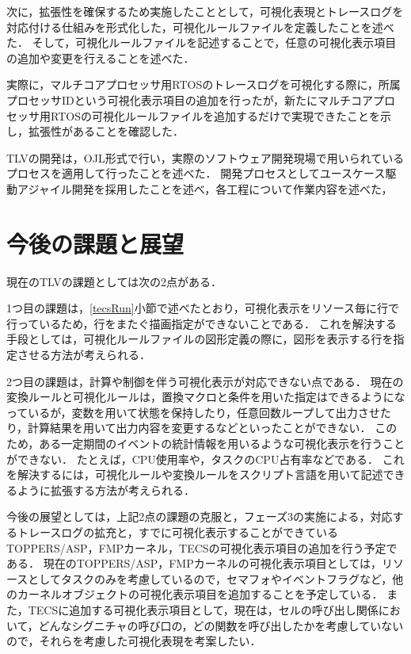 次に，拡張性を確保するため実施したこととして，可視化表現とトレースログを対応付ける仕組みを形式化した，可視化ルールファイルを定義したことを述べた．
そして，可視化ルールファイルを記述することで，任意の可視化表示項目の追加や変更を行えることを述べた．

実際に，マルチコアプロセッサ用RTOSのトレースログを可視化する際に，所属プロセッサIDという可視化表示項目の追加を行ったが，新たにマルチコアプロセッサ用RTOSの可視化ルールファイルを追加するだけで実現できたことを示し，拡張性があることを確認した．

TLVの開発は，OJL形式で行い，実際のソフトウェア開発現場で用いられているプロセスを適用して行ったことを述べた．
開発プロセスとしてユースケース駆動アジャイル開発を採用したことを述べ，各工程について作業内容を述べた，

\section{今後の課題と展望}

現在のTLVの課題としては次の2点がある．

1つ目の課題は，\ref{tecsRun}小節で述べたとおり，可視化表示をリソース毎に行で行っているため，行をまたぐ描画指定ができないことである．
これを解決する手段としては，可視化ルールファイルの図形定義の際に，図形を表示する行を指定させる方法が考えられる．

2つ目の課題は，計算や制御を伴う可視化表示が対応できない点である．
現在の変換ルールと可視化ルールは，置換マクロと条件を用いた指定はできるようになっているが，変数を用いて状態を保持したり，任意回数ループして出力させたり，計算結果を用いて出力内容を変更するなどといったことができない．
このため，ある一定期間のイベントの統計情報を用いるような可視化表示を行うことができない．
たとえば，CPU使用率や，タスクのCPU占有率などである．
これを解決するには，可視化ルールや変換ルールをスクリプト言語を用いて記述できるように拡張する方法が考えられる．

今後の展望としては，上記2点の課題の克服と，フェーズ3の実施による，対応するトレースログの拡充と，すでに可視化表示することができているTOPPERS/ASP，FMPカーネル，TECSの可視化表示項目の追加を行う予定である．
現在のTOPPERS/ASP，FMPカーネルの可視化表示項目としては，リソースとしてタスクのみを考慮しているので，セマフォやイベントフラグなど，他のカーネルオブジェクトの可視化表示項目を追加することを予定している．
また，TECSに追加する可視化表示項目として，現在は，セルの呼び出し関係において，どんなシグニチャの呼び口の，どの関数を呼び出したかを考慮していないので，それらを考慮した可視化表現を考案したい．
